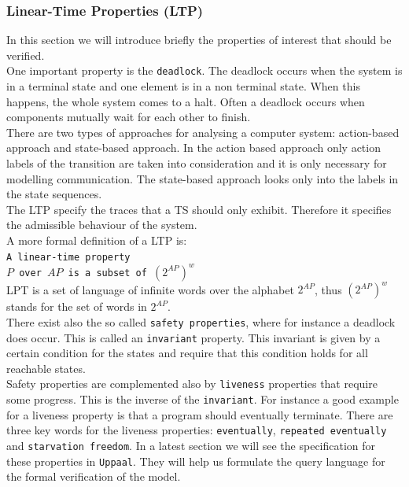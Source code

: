 \documentclass[a4paper, twocolumn]{article}
\begin{document}
\subsubsection{Linear-Time Properties (LTP)}
In this section we will introduce briefly the properties of interest that should be verified.\\
One important property is the \texttt{deadlock}. The deadlock occurs when the system is in a terminal state and one element is in a non terminal state. When this happens, the whole system comes to a halt. Often a deadlock occurs when components mutually wait for each other to finish.\\
There are two types of approaches for analysing a computer system: action-based approach and state-based approach. In the action based approach only action labels of the transition are taken into consideration and it is only necessary for modelling communication. The state-based approach looks only into the labels in the state sequences.\\
The LTP specify the traces that a TS should only exhibit. Therefore it specifies the admissible behaviour of the system.\\
A more formal definition of a LTP is:\\
\colorbox{backcolour}{\texttt{A linear-time property}}\\
\colorbox{backcolour}{\texttt{$P$ over $AP$ is a subset of $(2^{AP})^w$}}\\
LPT is a set of language of infinite words over the alphabet $2^{AP}$, thus $(2^{AP})^w$ stands for the set of words in $2^{AP}$.\\
There exist also the so called \texttt{safety properties}, where for instance a deadlock does occur. This is called an \texttt{invariant} property. This invariant is given by a certain condition for the states and require that this condition holds for all reachable states.\\
Safety properties are complemented also by \texttt{liveness} properties that require some progress. This is the inverse of the \texttt{invariant}. For instance a good example for a liveness property is that a program should eventually terminate. There are three key words for the liveness properties: \texttt{eventually}, \texttt{repeated eventually} and \texttt{starvation freedom}. In a latest section we will see the specification for these properties in \texttt{Uppaal}. They will help us formulate the query language for the formal verification of the model.

\end{document}
